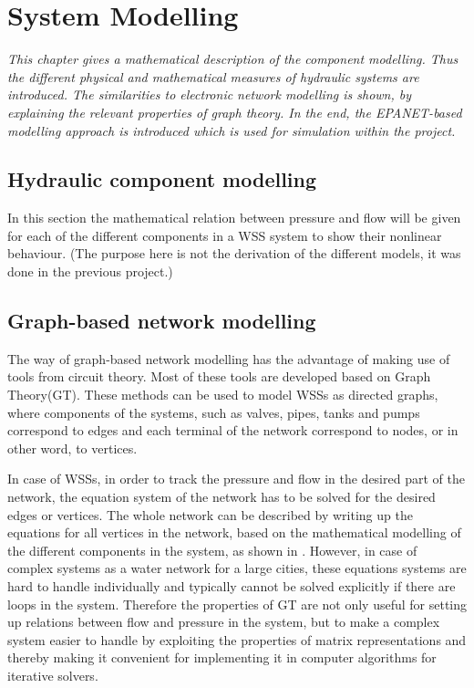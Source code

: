 \chapter{System Modelling}
\label{system_modelling}

\emph{This chapter gives a mathematical description of the component modelling. Thus the different physical and mathematical measures of hydraulic systems are introduced. The similarities to electronic network modelling is shown, by explaining the relevant properties of graph theory. In the end, the EPANET-based modelling approach is introduced which is used for simulation within the project.}

\section{Hydraulic component modelling}
\label{hydraulic_component_modelling}

In this section the mathematical relation between pressure and flow will be given for each of the different components in a WSS system to show their nonlinear behaviour. (The purpose here is not the derivation of the different models, it was done in the previous project.)

\section{Graph-based network modelling}
\label{graph_based_network_modelling}

The way of graph-based network modelling has the advantage of making use of tools from circuit theory. Most of these tools are developed based on Graph Theory(GT). These methods can be used to model WSSs as directed graphs, where components of the systems, such as valves, pipes, tanks and pumps correspond to edges and each terminal of the network correspond to nodes, or in other word, to vertices. 

In case of WSSs, in order to track the pressure and flow in the desired part of the network, the equation system of the network has to be solved for the desired edges or vertices. The whole network can be described by writing up the equations for all vertices in the network, based on the mathematical modelling of the different components in the system, as shown in . However, in case of complex systems as a water network for a large cities, these equations systems are hard to handle individually and typically cannot be solved explicitly if there are loops in the system. Therefore the properties of GT are not only useful for setting up relations between flow and pressure in the system, but to make a complex system easier to handle by exploiting the properties of matrix representations and thereby making it convenient for implementing it in computer algorithms for iterative solvers.  

